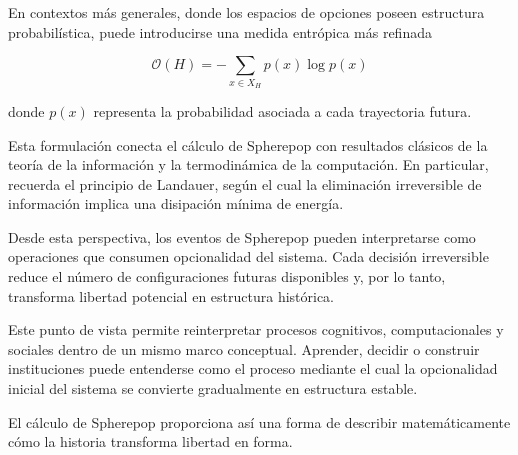 \documentclass[12pt]{article}
\begin{document}
En contextos más generales, donde los espacios de opciones poseen estructura probabilística, puede introducirse una medida entrópica más refinada

\[
\mathcal{O}(H) = - \sum_{x \in X_H} p(x) \log p(x)
\]

donde \(p(x)\) representa la probabilidad asociada a cada trayectoria futura.

Esta formulación conecta el cálculo de Spherepop con resultados clásicos de la teoría de la información y la termodinámica de la computación. En particular, recuerda el principio de Landauer, según el cual la eliminación irreversible de información implica una disipación mínima de energía.

Desde esta perspectiva, los eventos de Spherepop pueden interpretarse como operaciones que consumen opcionalidad del sistema. Cada decisión irreversible reduce el número de configuraciones futuras disponibles y, por lo tanto, transforma libertad potencial en estructura histórica.

Este punto de vista permite reinterpretar procesos cognitivos, computacionales y sociales dentro de un mismo marco conceptual. Aprender, decidir o construir instituciones puede entenderse como el proceso mediante el cual la opcionalidad inicial del sistema se convierte gradualmente en estructura estable.

El cálculo de Spherepop proporciona así una forma de describir matemáticamente cómo la historia transforma libertad en forma.
\end{document}
